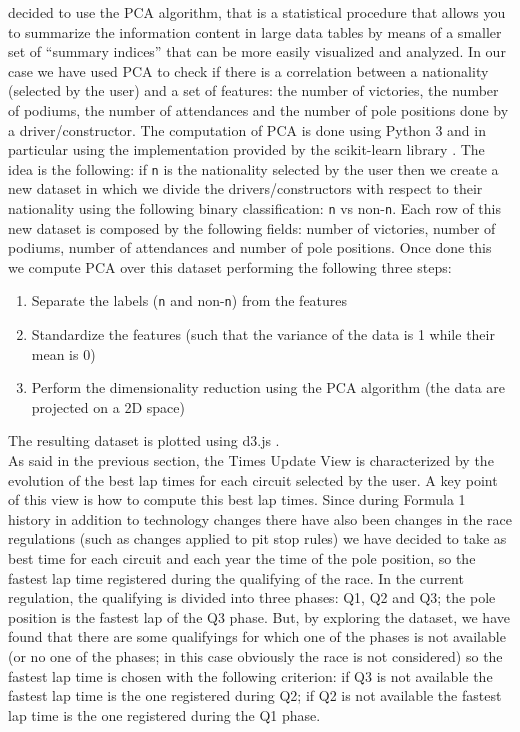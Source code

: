 \documentclass[10pt,twocolumn,letterpaper]{article}
\begin{document}
decided to use the PCA algorithm, that is a statistical procedure that allows you to summarize the information content in large data tables by means of a smaller set of “summary indices” 
that can be more easily visualized and analyzed. In our case we have used PCA to check if there is a correlation between a nationality (selected by the user) and a set of features:
the number of victories, the number of podiums, the number of attendances and the number of pole positions done by a driver/constructor. The computation of PCA is done using Python 3 
and in particular using the implementation provided by the scikit-learn library \cite{Scikit-learn}. The idea is the following: if \texttt{n} is the nationality selected by the user 
then we create a new dataset in which we divide the drivers/constructors with respect to their nationality using the following binary classification: \texttt{n} vs non-\texttt{n}. 
Each row of this new dataset is composed by the following fields: number of victories, number of podiums, number of attendances and number of pole positions. Once done this we compute
PCA over this dataset performing the following three steps:
\begin{enumerate}
	\item Separate the labels (\texttt{n} and non-\texttt{n}) from the features
	\item Standardize the features (such that the variance of the data is 1 while their mean is 0)
	\item Perform the dimensionality reduction using the PCA algorithm (the data are projected on a 2D space)
\end{enumerate}
The resulting dataset is plotted using d3.js \cite{D3}.\\
As said in the previous section, the Times Update View is characterized by the evolution of the best lap times for each circuit selected by the user. A key point of this view is how to 
compute this best lap times. Since during Formula 1 history in addition to technology changes there have also been changes in the race regulations (such as changes applied to pit stop
rules) we have decided to take as best time for each circuit and each year the time of the pole position, so the fastest lap time registered during the qualifying of the race.
In the current regulation, the qualifying is divided into three phases: Q1, Q2 and Q3; the pole position is the fastest lap of the Q3 phase. But, by exploring the dataset, we have found
that there are some qualifyings for which one of the phases is not available (or no one of the phases; in this case obviously the race is not considered) so the fastest lap time is chosen
with the following criterion: if Q3 is not available the fastest lap time is the one registered during Q2; if Q2 is not available the fastest lap time is the one registered during
the Q1 phase.
\end{document}

